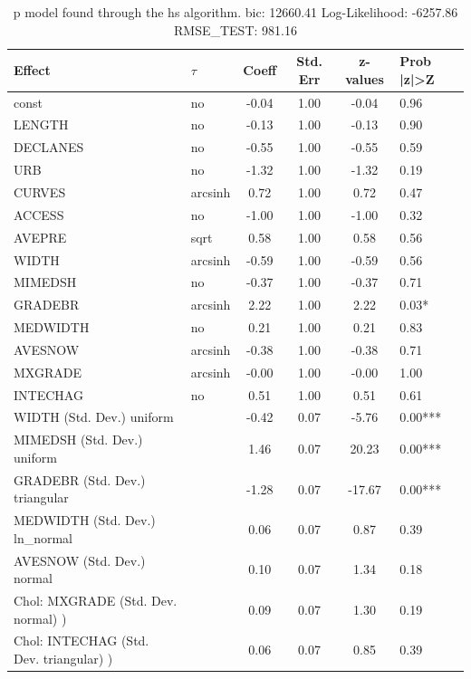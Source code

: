 \begin{table}
	\caption{p model found through the hs algorithm. bic: 12660.41 Log-Likelihood: -6257.86 RMSE_TEST: 981.16}
	\begin{center}
		\begin{tabular}{|l|l|c|c|c|l|}
			\hline
			Effect & $\tau$ & Coeff & Std. Err & z-values & Prob |z|>Z \\
			\hline
			const & no & -0.04 & 1.00 & -0.04 & 0.96 \\
			\hline
			LENGTH & no & -0.13 & 1.00 & -0.13 & 0.90 \\
			\hline
			DECLANES & no & -0.55 & 1.00 & -0.55 & 0.59 \\
			\hline
			URB & no & -1.32 & 1.00 & -1.32 & 0.19 \\
			\hline
			CURVES & arcsinh & 0.72 & 1.00 & 0.72 & 0.47 \\
			\hline
			ACCESS & no & -1.00 & 1.00 & -1.00 & 0.32 \\
			\hline
			AVEPRE & sqrt & 0.58 & 1.00 & 0.58 & 0.56 \\
			\hline
			WIDTH & arcsinh & -0.59 & 1.00 & -0.59 & 0.56 \\
			\hline
			MIMEDSH & no & -0.37 & 1.00 & -0.37 & 0.71 \\
			\hline
			GRADEBR & arcsinh & 2.22 & 1.00 & 2.22 & 0.03* \\
			\hline
			MEDWIDTH & no & 0.21 & 1.00 & 0.21 & 0.83 \\
			\hline
			AVESNOW & arcsinh & -0.38 & 1.00 & -0.38 & 0.71 \\
			\hline
			MXGRADE & arcsinh & -0.00 & 1.00 & -0.00 & 1.00 \\
			\hline
			INTECHAG & no & 0.51 & 1.00 & 0.51 & 0.61 \\
			\hline
			WIDTH (Std. Dev.) uniform &  & -0.42 & 0.07 & -5.76 & 0.00*** \\
			\hline
			MIMEDSH (Std. Dev.) uniform &  & 1.46 & 0.07 & 20.23 & 0.00*** \\
			\hline
			GRADEBR (Std. Dev.) triangular &  & -1.28 & 0.07 & -17.67 & 0.00*** \\
			\hline
			MEDWIDTH (Std. Dev.) ln_normal &  & 0.06 & 0.07 & 0.87 & 0.39 \\
			\hline
			AVESNOW (Std. Dev.) normal &  & 0.10 & 0.07 & 1.34 & 0.18 \\
			\hline
			 Chol: MXGRADE (Std. Dev. normal) ) &  & 0.09 & 0.07 & 1.30 & 0.19 \\
			\hline
			 Chol: INTECHAG (Std. Dev. triangular) ) &  & 0.06 & 0.07 & 0.85 & 0.39 \\

\end{tabular}
\end{center}
\end{table}
